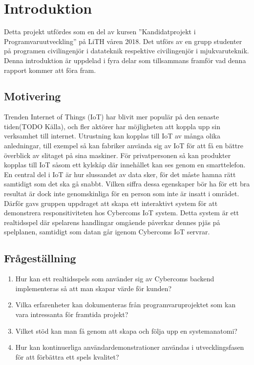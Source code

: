 \chapter{Introduktion}
\label{cha:introduction}

Detta projekt utfördes som en del av kursen ''Kandidatprojekt i Programvaruutveckling'' på LiTH våren 2018. Det utförs av en grupp studenter på programen civilingenjör i datateknik respektive civilingenjör i mjukvaruteknik.
Denna introduktion är uppdelad i fyra delar som tillsammans framför vad denna rapport kommer att föra fram.

\section{Motivering}
\label{sec:motivation}
Trenden Internet of Things (IoT) har blivit mer populär på den senaste tiden(TODO Källa), och fler aktörer har möjligheten att koppla upp sin verksamhet till internet. Utrustning kan kopplas till IoT av många olika anledningar, till exempel så kan fabriker använda sig av IoT för att få en bättre överblick av slitaget på sina maskiner. För privatpersonen så kan produkter kopplas till IoT såsom ett kylskåp där innehållet kan ses genom en smarttelefon. En central del i IoT är hur slussandet av data sker, för det måste hamna rätt samtidigt som det ska gå snabbt. Vilken siffra dessa egenskaper bör ha för ett bra resultat är dock inte genomskinliga för en person som inte är insatt i området. Därför gavs gruppen uppdraget att skapa ett interaktivt system för att demonstrera responsitiviteten hos Cybercoms IoT system. Detta system är ett realtidsspel där spelarens handlingar omgående påverkar dennes pjäs på spelplanen, samtidigt som datan går igenom Cybercoms IoT servrar.


\section{Frågeställning}

\begin{enumerate}
	\item \label{fs:fs_1} Hur kan ett realtidsspels som använder sig av Cybercoms backend implementeras så att man skapar värde för kunden?
	\item \label{fs:fs_2} Vilka erfarenheter kan dokumenteras från programvaruprojektet som kan vara intressanta för framtida projekt?
	\item \label{fs:fs_3} Vilket stöd kan man få genom att skapa och följa upp en systemanatomi?
	\item \label{fs:fs_4} Hur kan kontinuerliga användardemonstrationer användas i utvecklingsfasen för att förbättra ett spels kvalitet?

\end{enumerate}


